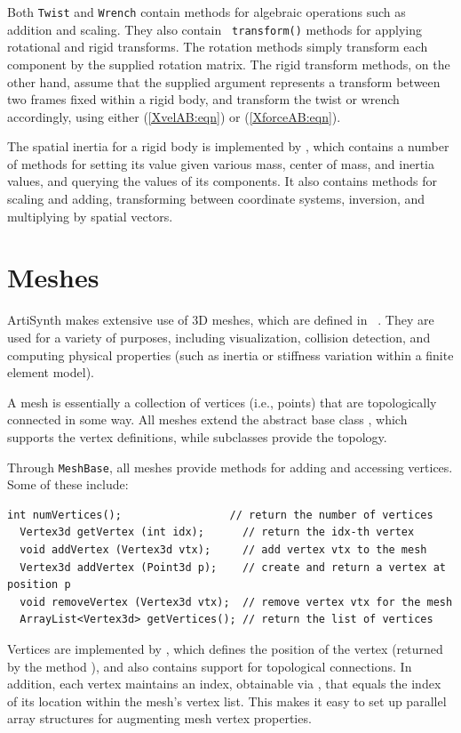 Both {\tt Twist} and {\tt Wrench} contain methods for algebraic
operations such as addition and scaling. They also contain {\tt
transform()} methods for applying rotational and rigid transforms.
The rotation methods simply transform each component by the supplied
rotation matrix. The rigid transform methods, on the other hand,
assume that the supplied argument represents a transform between two
frames fixed within a rigid body, and transform the twist or wrench
accordingly, using either (\ref{XvelAB:eqn}) or (\ref{XforceAB:eqn}).

The spatial inertia for a rigid body is implemented by
, which contains a
number of methods for setting its value given various mass, center of
mass, and inertia values, and querying the values of its components.
It also contains methods for scaling and adding, transforming between
coordinate systems, inversion, and multiplying by spatial vectors.

\section{Meshes}
\label{Meshes:sec}

ArtiSynth makes extensive use of 3D meshes, which are defined in {\tt
\mgeo}.  They are used for a variety of purposes, including
visualization, collision detection, and computing physical properties
(such as inertia or stiffness variation within a finite element
model).

A mesh is essentially a collection of vertices
(i.e., points) that are topologically connected in some way.  All
meshes extend the abstract base class
, which supports the vertex
definitions, while subclasses provide the topology.

Through {\tt MeshBase}, all meshes provide methods for
adding and accessing vertices. Some of these include:
\begin{lstlisting}[]
  int numVertices();                 // return the number of vertices
  Vertex3d getVertex (int idx);      // return the idx-th vertex
  void addVertex (Vertex3d vtx);     // add vertex vtx to the mesh
  Vertex3d addVertex (Point3d p);    // create and return a vertex at position p
  void removeVertex (Vertex3d vtx);  // remove vertex vtx for the mesh
  ArrayList<Vertex3d> getVertices(); // return the list of vertices
\end{lstlisting}
%
Vertices are implemented by ,
which defines the position of the vertex (returned by the method
), and also
contains support for topological connections. In addition, each vertex
maintains an index, obtainable via
, that equals the
index of its location within the mesh's vertex list. This makes it
easy to set up parallel array structures for augmenting mesh vertex
properties.


